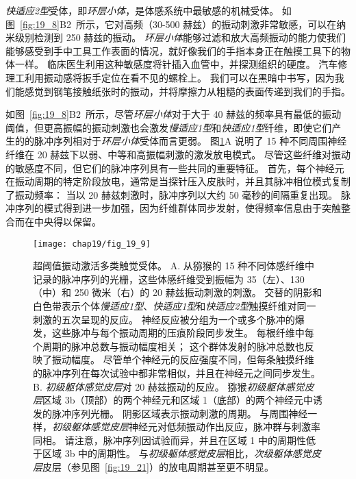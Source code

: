\textit{快适应2型}受体，即\textit{环层小体}，是体感系统中最敏感的机械受体。
如图~\ref{fig:19_8}B2~所示，它对高频（30-500 赫兹）的振动刺激非常敏感，可以在纳米级别检测到 250 赫兹的振动。
\textit{环层小体}能够过滤和放大高频振动的能力使我们能够感受到手中工具工作表面的情况，就好像我们的手指本身正在触摸工具下的物体一样。
临床医生利用这种敏感度将针插入血管中，并探测组织的硬度。
汽车修理工利用振动感将扳手定位在看不见的螺栓上。
我们可以在黑暗中书写，因为我们能感觉到钢笔接触纸张时的振动，并将摩擦力从粗糙的表面传递到我们的手指。


如图~\ref{fig:19_8}B2~所示，尽管\textit{环层小体}对于大于 40 赫兹的频率具有最低的振动阈值，但更高振幅的振动刺激也会激发\textit{慢适应1型}和\textit{快适应1型}纤维，即使它们产生的的脉冲序列相对于\textit{环层小体}受体而言更弱。
图\ref{fig:19_9}A 说明了 15 种不同周围神经纤维在 20 赫兹下以弱、中等和高振幅刺激的激发放电模式。
尽管这些纤维对振动的敏感度不同，但它们的脉冲序列具有一些共同的重要特征。
首先，每个神经元在振动周期的特定阶段放电，通常是当探针压入皮肤时，并且其脉冲相位模式复制了振动频率：
当以 20 赫兹刺激时，脉冲序列以大约 50 毫秒的间隔重复出现。
脉冲序列的模式得到进一步加强，因为纤维群体同步发射，使得频率信息由于突触整合而在中央得以保留。


\begin{figure}[htbp]
	\centering
	\texttt{[image: chap19/fig\_19\_9]}
	\caption{超阈值振动激活多类触觉受体。 
		A. 从猕猴的 15 种不同体感纤维中记录的脉冲序列的光栅，这些体感纤维受到振幅为 35（左）、130（中）和 250 微米（右）的 20 赫兹振动刺激的刺激。
		交替的阴影和白色带表示个体\textit{慢适应1型}、\textit{快适应1型}和\textit{快适应2型}触摸纤维对同一刺激的五次呈现的反应。
		神经反应被分组为一个或多个脉冲的爆发，这些脉冲与每个振动周期的压痕阶段同步发生。
		每根纤维中每个周期的脉冲总数与振动幅度相关； 这个群体发射的脉冲总数也反映了振动幅度。
		尽管单个神经元的反应强度不同，但每条触摸纤维的脉冲序列在每次试验中都非常相似，并且在神经元之间同步发生\cite{muniak2007neural}。
		B. \textit{初级躯体感觉皮层}对 20 赫兹振动的反应。
		猕猴\textit{初级躯体感觉皮层}区域 3b（顶部）的两个神经元和区域 1（底部）的两个神经元中诱发的脉冲序列光栅。
		阴影区域表示振动刺激的周期。
		与周围神经一样，\textit{初级躯体感觉皮层}神经元对低频振动作出反应，脉冲群与刺激率同相。
		请注意，脉冲序列因试验而异，并且在区域 1 中的周期性低于区域 3b 中的周期性。
		与\textit{初级躯体感觉皮层}相比，\textit{次级躯体感觉皮层}皮层（参见图~\ref{fig:19_21}）的放电周期甚至更不明显\cite{salinas2000periodicity}。}
	\label{fig:19_9}
\end{figure}


